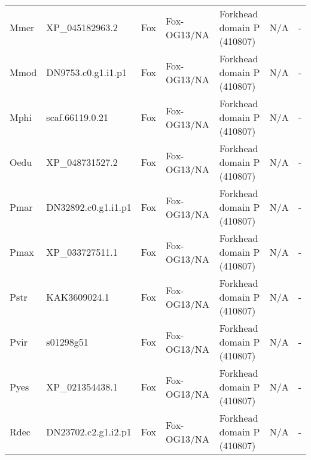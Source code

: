 \documentclass[../main.tex]{subfiles}
\begin{document}
\begin{landscape}
\begin{longtable}{lllllll}
		Mmer           & XP\_045182963.2       & Fox            & Fox-OG13/NA         & Forkhead domain P (410807)                  & N/A                                                                    & -                    \\
		Mmod           & DN9753.c0.g1.i1.p1    & Fox            & Fox-OG13/NA         & Forkhead domain P (410807)                  & N/A                                                                    & -                    \\
		Mphi           & scaf.66119.0.21       & Fox            & Fox-OG13/NA         & Forkhead domain P (410807)                  & N/A                                                                    & -                    \\
		Oedu           & XP\_048731527.2       & Fox            & Fox-OG13/NA         & Forkhead domain P (410807)                  & N/A                                                                    & -                    \\
		Pmar           & DN32892.c0.g1.i1.p1   & Fox            & Fox-OG13/NA         & Forkhead domain P (410807)                  & N/A                                                                    & -                    \\
		Pmax           & XP\_033727511.1       & Fox            & Fox-OG13/NA         & Forkhead domain P (410807)                  & N/A                                                                    & -                    \\
		Pstr           & KAK3609024.1          & Fox            & Fox-OG13/NA         & Forkhead domain P (410807)                  & N/A                                                                    & -                    \\
		Pvir           & s01298g51             & Fox            & Fox-OG13/NA         & Forkhead domain P (410807)                  & N/A                                                                    & -                    \\
		Pyes           & XP\_021354438.1       & Fox            & Fox-OG13/NA         & Forkhead domain P (410807)                  & N/A                                                                    & -                    \\
		Rdec           & DN23702.c2.g1.i2.p1   & Fox            & Fox-OG13/NA         & Forkhead domain P (410807)                  & N/A                                                                    & -                    \\

\end{longtable}
\end{landscape}
\end{document}
